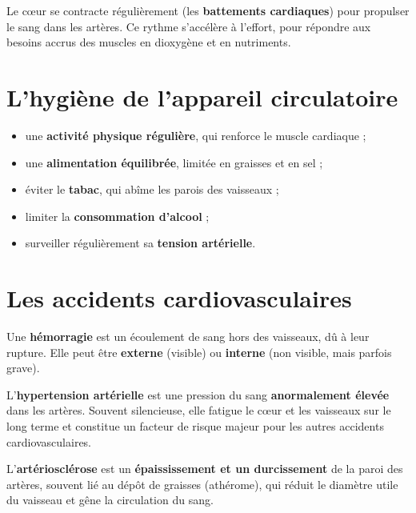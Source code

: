 \begin{propriete}
Le cœur se contracte régulièrement (les \textbf{battements cardiaques}) pour propulser
le sang dans les artères. Ce rythme s'accélère à l'effort, pour répondre aux besoins
accrus des muscles en dioxygène et en nutriments.
\end{propriete}

\section{L'hygiène de l'appareil circulatoire}

\begin{propriete}
\begin{itemize}
\item une \textbf{activité physique régulière}, qui renforce le muscle cardiaque ;
\item une \textbf{alimentation équilibrée}, limitée en graisses et en sel ;
\item éviter le \textbf{tabac}, qui abîme les parois des vaisseaux ;
\item limiter la \textbf{consommation d'alcool} ;
\item surveiller régulièrement sa \textbf{tension artérielle}.
\end{itemize}
\end{propriete}

\section{Les accidents cardiovasculaires}

\begin{definition}[Hémorragie]
Une \textbf{hémorragie} est un écoulement de sang hors des vaisseaux, dû à leur
rupture. Elle peut être \textbf{externe} (visible) ou \textbf{interne} (non
visible, mais parfois grave).
\end{definition}

\begin{definition}
L'\textbf{hypertension artérielle} est une pression du sang \textbf{anormalement
élevée} dans les artères. Souvent silencieuse, elle fatigue le cœur et les vaisseaux
sur le long terme et constitue un facteur de risque majeur pour les autres accidents
cardiovasculaires.
\end{definition}

\begin{definition}[Artériosclérose]
L'\textbf{artériosclérose} est un \textbf{épaississement et un durcissement} de la
paroi des artères, souvent lié au dépôt de graisses (athérome), qui réduit le diamètre
utile du vaisseau et gêne la circulation du sang.
\end{definition}


